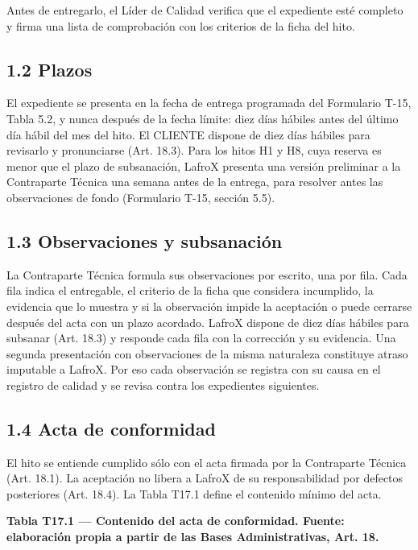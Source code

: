 Antes de entregarlo, el Líder de Calidad verifica que el expediente esté completo y firma una lista de comprobación con los criterios de la ficha del hito.

\subsection*{1.2 Plazos}

El expediente se presenta en la fecha de entrega programada del Formulario T-15, Tabla 5.2, y nunca después de la fecha límite: diez días hábiles antes del último día hábil del mes del hito. El CLIENTE dispone de diez días hábiles para revisarlo y pronunciarse (Art. 18.3). Para los hitos H1 y H8, cuya reserva es menor que el plazo de subsanación, LafroX presenta una versión preliminar a la Contraparte Técnica una semana antes de la entrega, para resolver antes las observaciones de fondo (Formulario T-15, sección 5.5).

\subsection*{1.3 Observaciones y subsanación}

La Contraparte Técnica formula sus observaciones por escrito, una por fila. Cada fila indica el entregable, el criterio de la ficha que considera incumplido, la evidencia que lo muestra y si la observación impide la aceptación o puede cerrarse después del acta con un plazo acordado. LafroX dispone de diez días hábiles para subsanar (Art. 18.3) y responde cada fila con la corrección y su evidencia. Una segunda presentación con observaciones de la misma naturaleza constituye atraso imputable a LafroX. Por eso cada observación se registra con su causa en el registro de calidad y se revisa contra los expedientes siguientes.

\subsection*{1.4 Acta de conformidad}

El hito se entiende cumplido sólo con el acta firmada por la Contraparte Técnica (Art. 18.1). La aceptación no libera a LafroX de su responsabilidad por defectos posteriores (Art. 18.4). La Tabla T17.1 define el contenido mínimo del acta.

\textbf{Tabla T17.1 — Contenido del acta de conformidad. Fuente: elaboración propia a partir de las Bases Administrativas, Art. 18.}


